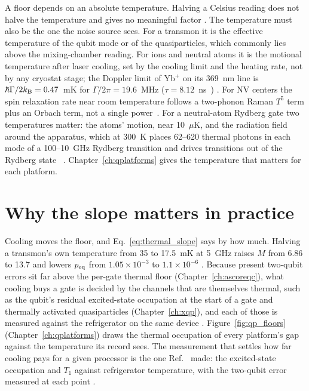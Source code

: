 \begin{remark}
A floor depends on an absolute temperature. Halving a Celsius reading does not halve the temperature and gives no meaningful factor \calc. The
temperature must also be the one the noise source sees. For a transmon it is the effective temperature of the qubit
mode or of the quasiparticles, which commonly lies above the mixing-chamber reading. For ions and neutral atoms it is
the motional temperature after laser cooling, set by the cooling limit and the heating rate, not by any cryostat
stage; the Doppler limit of Yb$^+$ on its 369~nm line is $\hbar\Gamma/2k_{\mathrm B}=0.47$~mK for $\Gamma/2\pi=19.6$~MHz ($\tau=8.12$~ns~\cite{Olmschenk2009})
\calc. For NV centers the spin relaxation rate near room temperature follows a two-phonon Raman $T^5$ term plus an
Orbach term, not a single power~\cite{Jarmola2012}.
For a neutral-atom Rydberg gate two temperatures matter: the atoms' motion, near 10~$\mu$K, and the radiation field around the apparatus, which at
300~K places 62--620 thermal photons in each mode of a 100--10~GHz Rydberg transition and drives transitions out of the Rydberg state
\calc~\cite{Beterov2009}. Chapter~\ref{ch:qplatforms} gives the temperature that matters for each platform.
\end{remark}

\section{Why the slope matters in practice}
Cooling moves the floor, and Eq.~\eqref{eq:thermal_slope} says by how much. Halving a transmon's own temperature from 35 to 17.5~mK at 5~GHz
raises $M$ from 6.86 to 13.7 and lowers $p_{\rm eq}$ from $1.05\times10^{-3}$ to $1.1\times10^{-6}$ \calc. Because present two-qubit errors sit
far above the per-gate thermal floor (Chapter~\ref{ch:ascoreqc}), what cooling buys a gate is decided by the channels that are themselves
thermal, such as the qubit's residual excited-state occupation at the start of a gate and thermally activated quasiparticles (Chapter~\ref{ch:xqp}),
and each of those is measured against the refrigerator on the same device \interp. Figure~\ref{fig:qp_floors} (Chapter~\ref{ch:qplatforms})
draws the thermal occupation of every platform's gap against the temperature its record sees. The measurement that settles how far cooling
pays for a given processor is the one Ref.~\cite{Jin2015} made: the excited-state occupation and $T_1$ against refrigerator temperature, with
the two-qubit error measured at each point \openprob.
